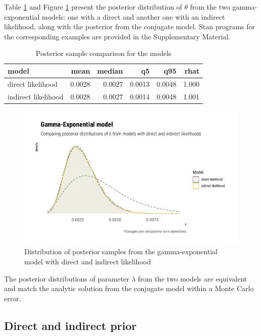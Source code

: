 \documentclass[
  12pt,
]{article}
\begin{document}
Table \ref{tab:gexp-likelihood-tab} and Figure \ref{fig:gexp-likelihood-graphs} present the posterior distribution of \(\theta\) from the two gamma-exponential models: one with a direct and another one with an indirect likelihood, along with the posterior from the conjugate model. Stan programs for the corresponding examples are provided in the Supplementary Material.

\begin{table}[!h]

\caption{\label{tab:gexp-likelihood-tab}Posterior sample comparison for the models}
\centering
\begin{tabular}[t]{lrrrrr}
\toprule
model & mean & median & q5 & q95 & rhat\\
\midrule
direct likelihood & 0.0028 & 0.0027 & 0.0013 & 0.0048 & 1.000\\
indirect likelihood & 0.0028 & 0.0027 & 0.0014 & 0.0048 & 1.001\\
\bottomrule
\end{tabular}
\end{table}

\begin{figure}

{\centering \includegraphics[width=0.8\linewidth]{ilbm_article_files/figure-latex/gexp-likelihood-graphs-1} 

}

\caption{Distribution of posterior samples from the gamma-exponential model with direct and indirect likelihood}\label{fig:gexp-likelihood-graphs}
\end{figure}

The posterior distributions of parameter \(\lambda\) from the two models are equivalent and match the analytic solution from the conjugate model within a Monte Carlo error.

\hypertarget{direct-and-indirect-prior}{%
\subsection{Direct and indirect prior}\label{direct-and-indirect-prior}}
\end{document}
